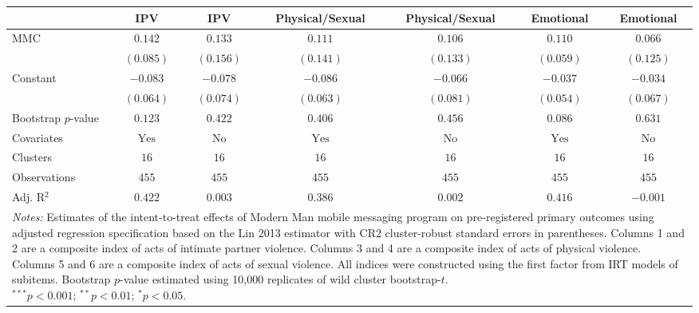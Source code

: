 
\begin{tabular}{l c c c c c c}
\toprule
 & IPV & IPV & Physical/Sexual & Physical/Sexual & Emotional & Emotional \\
\midrule
MMC                 & $0.142$        & $0.133$       & $0.111$        & $0.106$       & $0.110$        & $0.066$       \\
                    & $(0.085)$      & $(0.156)$     & $(0.141)$      & $(0.133)$     & $(0.059)$      & $(0.125)$     \\
Constant            & $-0.083$       & $-0.078$      & $-0.086$       & $-0.066$      & $-0.037$       & $-0.034$      \\
                    & $(0.064)$      & $(0.074)$     & $(0.063)$      & $(0.081)$     & $(0.054)$      & $(0.067)$     \\
\midrule
Bootstrap $p$-value & $0.123$        & $0.422$       & $0.406$        & $0.456$       & $0.086$        & $0.631$       \\
Covariates          & $\textrm{Yes}$ & $\textrm{No}$ & $\textrm{Yes}$ & $\textrm{No}$ & $\textrm{Yes}$ & $\textrm{No}$ \\
Clusters            & $16$           & $16$          & $16$           & $16$          & $16$           & $16$          \\
Observations        & $455$          & $455$         & $455$          & $455$         & $455$          & $455$         \\
Adj. R$^2$          & $0.422$        & $0.003$       & $0.386$        & $0.002$       & $0.416$        & $-0.001$      \\
\bottomrule
\multicolumn{7}{l}{\scriptsize{\parbox{\linewidth}{\vspace{2pt} 
       \textit{Notes:} Estimates of the intent-to-treat effects of Modern Man mobile 
       messaging program on pre-registered primary outcomes using adjusted regression 
       specification based on the Lin 2013 estimator with CR2 cluster-robust 
       standard errors in parentheses. Columns 1 and 2 are a composite index of 
       acts of intimate partner violence. Columns 3 and 4 are a composite index of acts
       of physical violence. Columns 5 and 6 are a composite index of acts of sexual violence.
       All indices were constructed using the first factor from IRT models of subitems. 
       Bootstrap $p$-value estimated using 10,000 replicates of wild cluster bootstrap-$t$. \\ $^{***}p<0.001$; $^{**}p<0.01$; $^{*}p<0.05$.}}}
\end{tabular}

